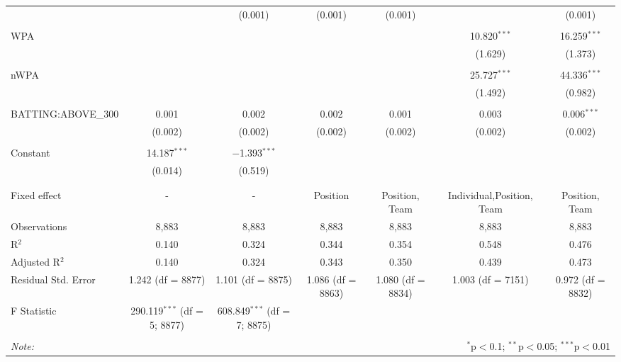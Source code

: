 \begin{table}[!htbp]
\begin{tabular}{@{\extracolsep{5pt}}lcccccc}
  &  & (0.001) & (0.001) & (0.001) &  & (0.001) \\
  & & & & & & \\
 WPA &  &  &  &  & 10.820$^{***}$ & 16.259$^{***}$ \\
  &  &  &  &  & (1.629) & (1.373) \\
  & & & & & & \\
 nWPA &  &  &  &  & 25.727$^{***}$ & 44.336$^{***}$ \\
  &  &  &  &  & (1.492) & (0.982) \\
  & & & & & & \\
 BATTING:ABOVE\_300 & 0.001 & 0.002 & 0.002 & 0.001 & 0.003 & 0.006$^{***}$ \\
  & (0.002) & (0.002) & (0.002) & (0.002) & (0.002) & (0.002) \\
  & & & & & & \\
 Constant & 14.187$^{***}$ & $-$1.393$^{***}$ &  &  &  &  \\
  & (0.014) & (0.519) &  &  &  &  \\
  & & & & & & \\
\hline \\[-1.8ex]
Fixed effect & - & - & Position & Position, Team & Individual,Position, Team & Position, Team \\
Observations & 8,883 & 8,883 & 8,883 & 8,883 & 8,883 & 8,883 \\
R$^{2}$ & 0.140 & 0.324 & 0.344 & 0.354 & 0.548 & 0.476 \\
Adjusted R$^{2}$ & 0.140 & 0.324 & 0.343 & 0.350 & 0.439 & 0.473 \\
Residual Std. Error & 1.242 (df = 8877) & 1.101 (df = 8875) & 1.086 (df = 8863) & 1.080 (df = 8834) & 1.003 (df = 7151) & 0.972 (df = 8832) \\
F Statistic & 290.119$^{***}$ (df = 5; 8877) & 608.849$^{***}$ (df = 7; 8875) &  &  &  &  \\
\hline
\hline \\[-1.8ex]
\textit{Note:}  & \multicolumn{6}{r}{$^{*}$p$<$0.1; $^{**}$p$<$0.05; $^{***}$p$<$0.01} \\
\end{tabular}
\end{table}
